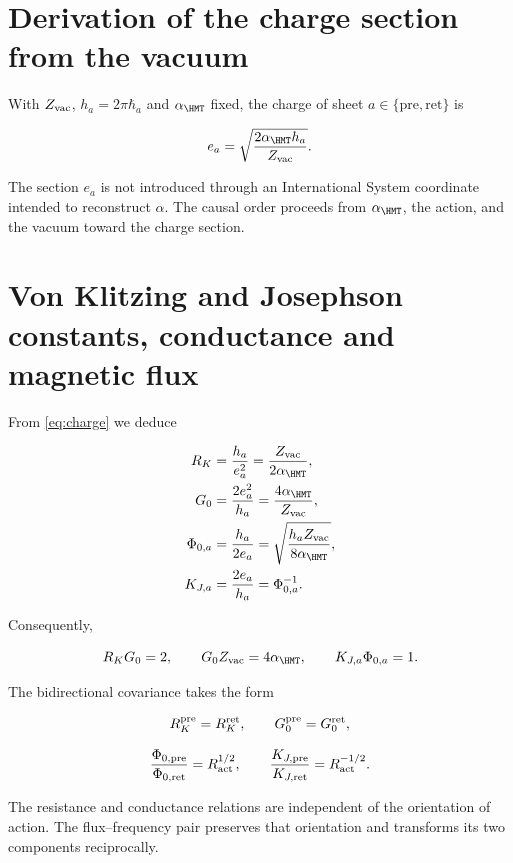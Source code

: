 \label{ch:metrology}

\section{Derivation of the charge section from the vacuum}

With \(Z_{\rm vac}\), \(h_a=2\pi\hbar_a\) and \(\alpha_{\HMT}\) fixed, the charge of sheet \(a\in\{\mathrm{pre},\mathrm{ret}\}\) is

\begin{equation}
e_a=\sqrt{\frac{2\alpha_{\HMT}h_a}{Z_{\rm vac}}}.
\label{eq:charge}
\end{equation}

The section \(e_a\) is not introduced through an International System
coordinate intended to reconstruct \(\alpha\). The causal order proceeds from
\(\alpha_{\HMT}\), the action, and the vacuum toward the charge section.

\section{Von Klitzing and Josephson constants, conductance and magnetic flux}

From \cref{eq:charge} we deduce

\begin{align}
R_K&=\frac{h_a}{e_a^2}=\frac{Z_{\rm vac}}{2\alpha_{\HMT}},
\label{eq:rk}\\
G_0&=\frac{2e_a^2}{h_a}=\frac{4\alpha_{\HMT}}{Z_{\rm vac}},
\label{eq:g0}\\
\Phi_{0,a}&=\frac{h_a}{2e_a}
=\sqrt{\frac{h_aZ_{\rm vac}}{8\alpha_{\HMT}}},
\label{eq:phi0}\\
K_{J,a}&=\frac{2e_a}{h_a}=\Phi_{0,a}^{-1}.
\label{eq:kj}
\end{align}

Consequently,

\begin{equation}
R_KG_0=2,\qquad G_0Z_{\rm vac}=4\alpha_{\HMT},
\qquad K_{J,a}\Phi_{0,a}=1.
\label{eq:quantum-electrical-identities}
\end{equation}

The bidirectional covariance takes the form

\[
R_K^{\rm pre}=R_K^{\rm ret},\qquad
G_0^{\rm pre}=G_0^{\rm ret},
\]

\[
\frac{\Phi_{0,\rm pre}}{\Phi_{0,\rm ret}}=R_{\rm act}^{1/2},
\qquad
\frac{K_{J,\rm pre}}{K_{J,\rm ret}}=R_{\rm act}^{-1/2}.
\]

The resistance and conductance relations are independent of the
orientation of action. The flux--frequency pair preserves that
orientation and transforms its two components reciprocally.

